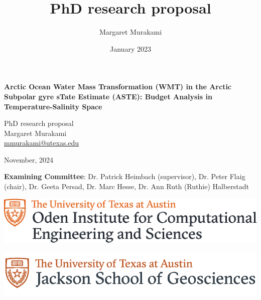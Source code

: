 \documentclass[a4paper,12pt]{article}
\author{Margaret Murakami}
\title{PhD research proposal}
\date{January 2023}
\begin{document}
	
	\begin{center}
	\thispagestyle{empty}
		\begin{LARGE}
		\textbf{Arctic Ocean Water Mass Transformation (WMT) in the Arctic Subpolar gyre sTate Estimate (ASTE): Budget Analysis in Temperature-Salinity Space} \\[1 cm] \vfill
		\end{LARGE}
			
			
		\begin{Large}
			PhD research proposal \\ [1 cm]\vfill
			Margaret Murakami \\
			\href{mailto:<email>}{mmurakami@utexas.edu} \\[1 cm]\vfill
			
			
			November, 2024\\[1 cm]\vfill

                \textbf{Examining Committee}: Dr. Patrick Heimbach (supervisor), Dr. Peter Flaig (chair), Dr. Geeta Persad, Dr. Marc Hesse, Dr. Ann Ruth (Ruthie) Halberstadt \\[1 cm]\vfill
			
            \begin{center}
                \begin{minipage}{0.45\textwidth}
                    \centering
                    \includegraphics[width=\linewidth]{../figures/CMYK_formal_Oden_ICES.pdf}
                \end{minipage}%
                \hfill
                \begin{minipage}{0.45\textwidth}
                    \centering
                    \includegraphics[width=\linewidth]{../figures/jsg_formal_fullColor.png}
                \end{minipage}
            \end{center}
            
			
		\end{Large}
	\end{center}
	
\end{document}
